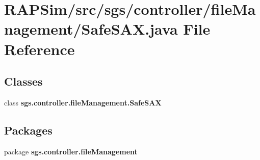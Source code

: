 \section{R\-A\-P\-Sim/src/sgs/controller/file\-Management/\-Safe\-S\-A\-X.java File Reference}
\label{_safe_s_a_x_8java}
\subsection*{Classes}
\begin{DoxyCompactItemize}
\item 
class {\bf sgs.\-controller.\-file\-Management.\-Safe\-S\-A\-X}
\end{DoxyCompactItemize}
\subsection*{Packages}
\begin{DoxyCompactItemize}
\item 
package {\bf sgs.\-controller.\-file\-Management}
\end{DoxyCompactItemize}
